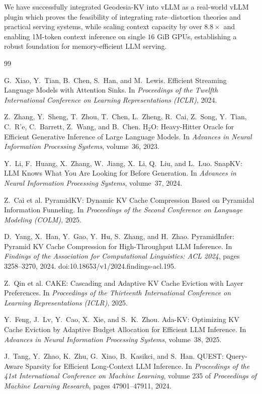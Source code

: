 \documentclass[10pt,twocolumn]{article}
\newcommand{\method}{Geodesia-KV}
\begin{document}
We have successfully integrated \method{} into vLLM as a real-world vLLM plugin which proves the feasibility of integrating rate--distortion theories and practical serving systems, while scaling context capacity by over $8.8\times$ and enabling 1M-token context inference on single $16\text{ GiB}$ GPUs, establishing a robust foundation for memory-efficient LLM serving.
\begin{thebibliography}{99}\small

G.~Xiao, Y.~Tian, B.~Chen, S.~Han, and M.~Lewis.
Efficient Streaming Language Models with Attention Sinks.
In \emph{Proceedings of the Twelfth International Conference on
Learning Representations (ICLR)}, 2024.

Z.~Zhang, Y.~Sheng, T.~Zhou, T.~Chen, L.~Zheng, R.~Cai,
Z.~Song, Y.~Tian, C.~R{'e}, C.~Barrett, Z.~Wang, and B.~Chen.
H$_2$O: Heavy-Hitter Oracle for Efficient Generative Inference
of Large Language Models.
In \emph{Advances in Neural Information Processing Systems},
volume~36, 2023.

Y.~Li, F.~Huang, X.~Zhang, W.~Jiang, X.~Li, Q.~Liu, and L.~Luo.
SnapKV: LLM Knows What You Are Looking for Before Generation.
In \emph{Advances in Neural Information Processing Systems},
volume~37, 2024.

Z.~Cai et al.
PyramidKV: Dynamic KV Cache Compression Based on Pyramidal
Information Funneling.
In \emph{Proceedings of the Second Conference on Language
Modeling (COLM)}, 2025.

D.~Yang, X.~Han, Y.~Gao, Y.~Hu, S.~Zhang, and H.~Zhao.
PyramidInfer: Pyramid KV Cache Compression for High-Throughput
LLM Inference.
In \emph{Findings of the Association for Computational
Linguistics: ACL 2024}, pages 3258--3270, 2024.
doi:10.18653/v1/2024.findings-acl.195.

Z.~Qin et al.
CAKE: Cascading and Adaptive KV Cache Eviction with Layer
Preferences.
In \emph{Proceedings of the Thirteenth International Conference
on Learning Representations (ICLR)}, 2025.

Y.~Feng, J.~Lv, Y.~Cao, X.~Xie, and S.~K.~Zhou.
Ada-KV: Optimizing KV Cache Eviction by Adaptive Budget
Allocation for Efficient LLM Inference.
In \emph{Advances in Neural Information Processing Systems},
volume~38, 2025.

J.~Tang, Y.~Zhao, K.~Zhu, G.~Xiao, B.~Kasikci, and S.~Han.
QUEST: Query-Aware Sparsity for Efficient Long-Context LLM
Inference.
In \emph{Proceedings of the 41st International Conference on
Machine Learning}, volume 235 of \emph{Proceedings of Machine
Learning Research}, pages 47901--47911, 2024.


\end{thebibliography}
\end{document}
